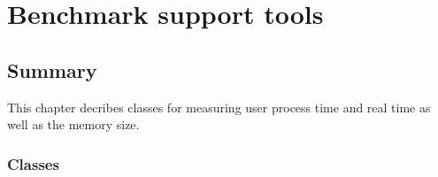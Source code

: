 
\chapter{Benchmark support tools}

\section*{Summary}

This chapter decribes classes for measuring user process time and real time
as well as the memory size.

\subsection*{Classes}
\\
\\
\\

